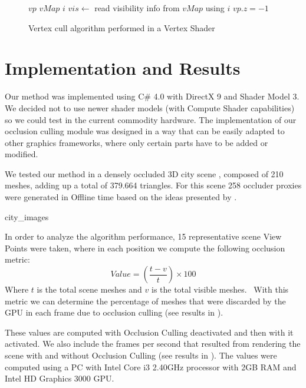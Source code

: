 \documentclass[10pt, conference]{IEEEtran}
\begin{document}
\begin{figure}[!hbp]
	
	\begin{algorithmic}[1]
		\REQUIRE $vp$ 
		\REQUIRE $vMap$ 
		\REQUIRE $i$ 
		\STATE $vis \leftarrow$ read visibility info from $vMap$ using $i$
			\STATE {}
		\ELSE
			\STATE $vp.z = -1$ 
		\ENDIF
	\end{algorithmic}
	\caption{Vertex cull algorithm performed in a Vertex Shader}
	\label{alg:vertex_shader}
\end{figure}





\section{Implementation and Results}
%
Our method was implemented using C\# 4.0 with DirectX 9 and Shader Model 3. 
We decided not to use newer shader models (with Compute Shader capabilities) so we could test in the current commodity hardware. 
The implementation of our occlusion culling module was designed in a way that can be easily adapted to other graphics frameworks, where only certain parts have to be added or modified.\

We tested our method in a densely occluded 3D city scene , composed of 210 meshes, adding up a total of 379.664 triangles. 
For this scene 258 occluder proxies were generated in Offline time based on the ideas presented by \cite{cacic_occlusion_1}. 

{city_images}{
%
}




In order to analyze the algorithm performance, 15 representative scene View Points were taken, where in each position we compute the following 
occlusion metric:
\[
	Value = (\frac{t - v}{t}) \times 100
\]
Where $t$ is the total scene meshes and $v$ is the total visible meshes. \
With this metric we can determine the percentage of meshes that were discarded by the GPU in each frame due to occlusion culling (see results in ).\

These values are computed with Occlusion Culling deactivated and then with it activated. 
We also include the frames per second that resulted from rendering the scene with and without Occlusion Culling (see results in ). 
The values were computed using a PC with Intel Core i3 2.40GHz processor with 2GB RAM and Intel HD Graphics 3000 GPU.
\end{document}
